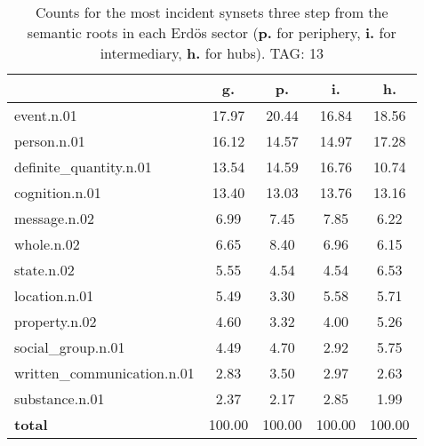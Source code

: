 \begin{table}[h!]
\begin{center}
\begin{tabular}{| l || c | c | c | c |}\hline
 & {\bf g.} & {\bf p.} & {\bf i.} & {\bf h.} \\\hline\hline
event.n.01 & 17.97  & 20.44  & 16.84  & 18.56 \\\hline
person.n.01 & 16.12  & 14.57  & 14.97  & 17.28 \\\hline
definite\_quantity.n.01 & 13.54  & 14.59  & 16.76  & 10.74 \\\hline
cognition.n.01 & 13.40  & 13.03  & 13.76  & 13.16 \\\hline
message.n.02 & 6.99  & 7.45  & 7.85  & 6.22 \\\hline
whole.n.02 & 6.65  & 8.40  & 6.96  & 6.15 \\\hline
state.n.02 & 5.55  & 4.54  & 4.54  & 6.53 \\\hline
location.n.01 & 5.49  & 3.30  & 5.58  & 5.71 \\\hline
property.n.02 & 4.60  & 3.32  & 4.00  & 5.26 \\\hline
social\_group.n.01 & 4.49  & 4.70  & 2.92  & 5.75 \\\hline
written\_communication.n.01 & 2.83  & 3.50  & 2.97  & 2.63 \\\hline
substance.n.01 & 2.37  & 2.17  & 2.85  & 1.99 \\\hline\hline
{{\bf total}} & 100.00  & 100.00  & 100.00  & 100.00 \\\hline
\end{tabular}
\caption{Counts for the most incident synsets three step from the semantic roots in each Erd\"os sector ({\bf p.} for periphery, {\bf i.} for intermediary, {\bf h.} for hubs). TAG: 13}
\end{center}
\end{table}